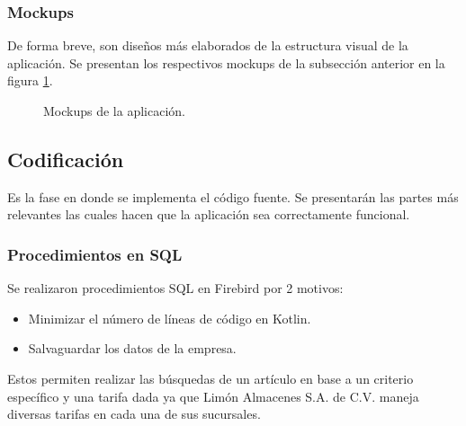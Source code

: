 \subsubsection{Mockups}
De forma breve, son diseños más elaborados de la estructura visual de la aplicación. Se presentan los respectivos mockups de la subsección anterior en la figura \ref{mockups}.

\begin{figure}[!h]
	\centering
	\caption{Mockups de la aplicación.}
	\label{mockups}
\end{figure}

\subsection{Codificación}
Es la fase en donde se implementa el código fuente. Se presentarán las partes más relevantes las cuales hacen que la aplicación sea correctamente funcional.

\subsubsection{Procedimientos en SQL}
Se realizaron procedimientos SQL en Firebird por 2 motivos:

\begin{itemize}
	\item Minimizar el número de líneas de código en Kotlin.
	\item Salvaguardar los datos de la empresa.
\end{itemize}

Estos permiten realizar las búsquedas de un artículo en base a un criterio específico y una tarifa dada ya que Limón Almacenes S.A. de C.V. maneja diversas tarifas en cada una de sus sucursales.

